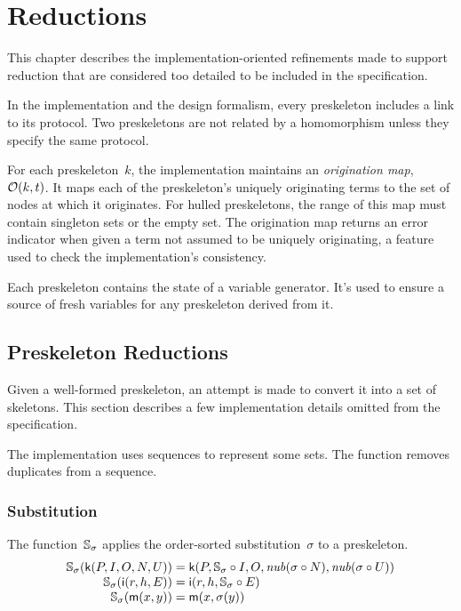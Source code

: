 \documentclass[12pt]{report}
\theoremstyle{definition}
\begin{document}
\chapter{Reductions}\label{cha:reductions}

This chapter describes the implementation-oriented refinements made to
support reduction that are considered too detailed to be included in
the specification.

In the {\cpsa} implementation and the design formalism, every
preskeleton includes a link to its protocol.  Two preskeletons are not
related by a homomorphism unless they specify the same protocol.

For each preskeleton~$k$, the implementation maintains an
 \emph{origination map}, $\mathcal{O}(k,t)$.  It maps
each of the preskeleton's uniquely originating terms to the set of
nodes at which it originates.  For hulled preskeletons, the range of
this map must contain singleton sets or the empty set.  The
origination map returns an error indicator when given a term not assumed
to be uniquely originating, a feature used to check the
implementation's consistency.

Each preskeleton contains the state of a variable generator.  It's
used to ensure a source of fresh variables for any preskeleton derived
from it.

\section{Preskeleton Reductions}\label{sec:preskeleton reductions}

Given a well-formed preskeleton, an attempt is made to convert it into
a set of skeletons.  This section describes a few implementation
details omitted from the specification.

The implementation uses sequences to represent some sets.  The
function  removes duplicates from a sequence.

\subsection{Substitution}

The function~$\mathbb S_\sigma$ applies the order-sorted substitution~$\sigma$
to a preskeleton.
$$
\begin{array}{r@{}c@{}l}
\ops{S}_\sigma(\cn{k}(P, I, O, N, U))&{}={}&
\cn{k}(P, \ops{S}_\sigma\circ I, O, \fn{nub}(\sigma\circ N),
\fn{nub}(\sigma\circ U))\\
\ops{S}_\sigma(\cn{i}(r,h,E))&{}={}&\cn{i}(r, h, \ops{S}_\sigma\circ E)\\
\ops{S}_\sigma(\cn{m}(x,y))&{}={}&\cn{m}(x,\sigma(y))
\end{array}
$$
\end{document}
